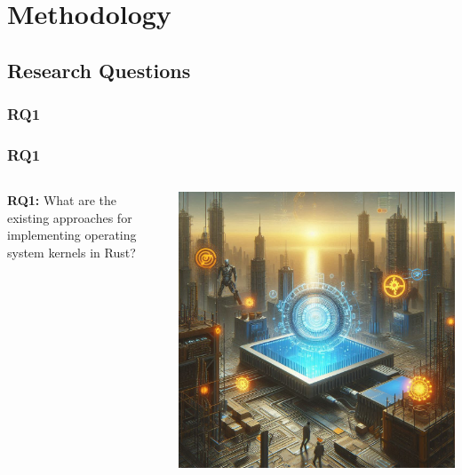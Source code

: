 \documentclass{beamer}
\begin{document}
\section{Methodology}

\subsection{Research Questions}

\subsubsection{RQ1}
\begin{frame}
  \frametitle{RQ1}
  \begin{columns}
    \begin{column}{0.5\textwidth}
      \textbf{RQ1:} What are the existing approaches for implementing operating system kernels in Rust?\footnotemark[2]
    \end{column}
    \begin{column}{0.5\textwidth}
      \includegraphics[width=.8\textwidth]{images/rq1.jpeg}
    \end{column}
  \end{columns}
\end{frame}
\end{document}
